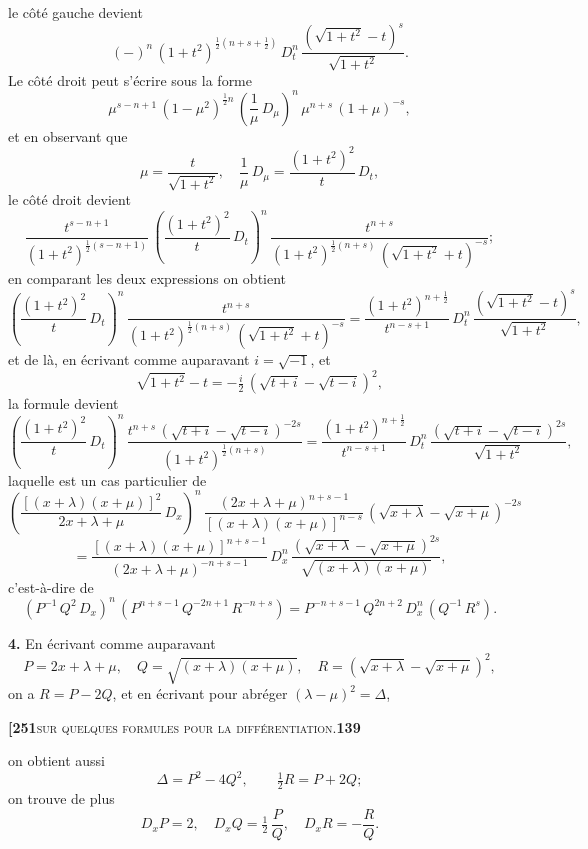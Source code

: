 \documentclass[11pt]{article}
\begin{document}
\medskip

\noindent le côté gauche devient
\[
(-)^n\,(1+t^2)^{\frac{1}{2}(n+s+\frac{1}{2})}\,D_t^n\,\frac{(\sqrt{1+t^2}-t)^s}{\sqrt{1+t^2}}.
\]
Le côté droit peut s'écrire sous la forme
\[
\mu^{s-n+1}\,(1-\mu^2)^{\frac{1}{2}n}\,\left(\frac{1}{\mu}\,D_{\mu}\right)^n\,\mu^{n+s}\,(1+\mu)^{-s},
\]
et en observant que
\[
\mu = \frac{t}{\sqrt{1+t^2}},\quad \frac{1}{\mu}\,D_{\mu} = \frac{(1+t^2)^2}{t}\,D_t,
\]
le côté droit devient
\[
\frac{t^{s-n+1}}{(1+t^2)^{\frac{1}{2}(s-n+1)}}\,\left(\frac{(1+t^2)^2}{t}\,D_t\right)^n\,\frac{t^{n+s}}{(1+t^2)^{\frac{1}{2}(n+s)}\,(\sqrt{1+t^2}+t)^{-s}};
\]
en comparant les deux expressions on obtient
\[
\left(\frac{(1+t^2)^2}{t}\,D_t\right)^n\,\frac{t^{n+s}}{(1+t^2)^{\frac{1}{2}(n+s)}\,(\sqrt{1+t^2}+t)^{-s}} = \frac{(1+t^2)^{n+\frac{1}{2}}}{t^{n-s+1}}\,D_t^n\,\frac{(\sqrt{1+t^2}-t)^s}{\sqrt{1+t^2}},
\]
et de là, en écrivant comme auparavant $i = \sqrt{-1}$, et
\[
\sqrt{1+t^2} - t = -\tfrac{i}{2}\,(\sqrt{t+i} - \sqrt{t-i})^2,
\]
la formule devient
\[
\left(\frac{(1+t^2)^2}{t}\,D_t\right)^n\,\frac{t^{n+s}\,(\sqrt{t+i}-\sqrt{t-i})^{-2s}}{(1+t^2)^{\frac{1}{2}(n+s)}} = \frac{(1+t^2)^{n+\frac{1}{2}}}{t^{n-s+1}}\,D_t^n\,\frac{(\sqrt{t+i}-\sqrt{t-i})^{2s}}{\sqrt{1+t^2}},
\]
laquelle est un cas particulier de
\[
\left(\frac{[(x+\lambda)(x+\mu)]^2}{2x+\lambda+\mu}\,D_x\right)^n\,\frac{(2x+\lambda+\mu)^{n+s-1}}{[(x+\lambda)(x+\mu)]^{n-s}}\,(\sqrt{x+\lambda}-\sqrt{x+\mu})^{-2s}
\]
\[
= \frac{[(x+\lambda)(x+\mu)]^{n+s-1}}{(2x+\lambda+\mu)^{-n+s-1}}\,D_x^n\,\frac{(\sqrt{x+\lambda}-\sqrt{x+\mu})^{2s}}{\sqrt{(x+\lambda)(x+\mu)}},
\]
c'est-à-dire de
\[
(P^{-1}\,Q^2\,D_x)^n\,(P^{n+s-1}\,Q^{-2n+1}\,R^{-n+s}) = P^{-n+s-1}\,Q^{2n+2}\,D_x^n\,(Q^{-1}\,R^s).
\]

\medskip

\textbf{4.} En écrivant comme auparavant
\[
P = 2x + \lambda + \mu,\quad Q = \sqrt{(x+\lambda)(x+\mu)},\quad R = (\sqrt{x+\lambda} - \sqrt{x+\mu})^2,
\]
on a $R = P - 2Q$, et en écrivant pour abréger $(\lambda - \mu)^2 = \Delta$,

\newpage

\noindent\textbf{[251}\hfill\textsc{sur quelques formules pour la différentiation.}\hfill\textbf{139}

\medskip

\noindent on obtient aussi
\[
\Delta = P^2 - 4Q^2,\qquad \tfrac{1}{2}R = P + 2Q;
\]
on trouve de plus
\[
D_x P = 2,\quad D_x Q = \tfrac{1}{2}\,\frac{P}{Q},\quad D_x R = -\frac{R}{Q}.
\]

\medskip
\end{document}
